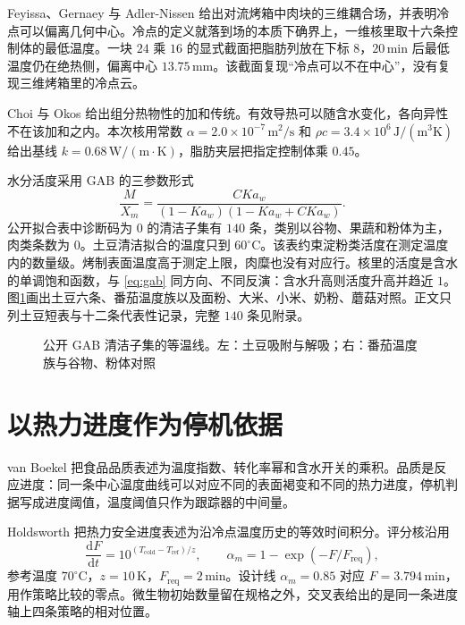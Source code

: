 Feyissa、Gernaey 与 Adler-Nissen 给出对流烤箱中肉块的三维耦合场，并表明冷点可以偏离几何中心\cite{feyissa2013}。冷点的定义就落到场的本质下确界上，一维核里取十六条控制体的最低温度。一块 \(24\) 乘 \(16\) 的显式截面把脂肪列放在下标 \(8\)，\(20\,\mathrm{min}\) 后最低温度仍在绝热侧，偏离中心 \(13.75\,\mathrm{mm}\)。该截面复现“冷点可以不在中心”，没有复现三维烤箱里的冷点云。

Choi 与 Okos 给出组分热物性的加和传统\cite{choi1986}。有效导热可以随含水变化，各向异性不在该加和之内。本次核用常数 \(\alpha=2.0\times 10^{-7}\,\mathrm{m}^2/\mathrm{s}\) 和 \(\rho c=3.4\times 10^{6}\,\mathrm{J}/(\mathrm{m}^3\mathrm{K})\) 给出基线 \(k=0.68\,\mathrm{W}/(\mathrm{m\cdot K})\)，脂肪夹层把指定控制体乘 \(0.45\)。

水分活度采用 GAB 的三参数形式\cite{gab1980}
\begin{equation}
\label{eq:gab}
\frac{M}{X_m}=\frac{C K a_w}{(1-K a_w)(1-K a_w+C K a_w)}.
\end{equation}
公开拟合表\cite{sorption2026}中诊断码为 \(0\) 的清洁子集有 \(140\) 条，类别以谷物、果蔬和粉体为主，肉类条数为 \(0\)。土豆清洁拟合的温度只到 \(60^\circ\mathrm{C}\)。该表约束淀粉类活度在测定温度内的数量级。烤制表面温度高于测定上限，肉糜也没有对应行。核里的活度是含水的单调饱和函数，与 \eqref{eq:gab} 同方向、不同反演：含水升高则活度升高并趋近 \(1\)。图\ref{fig:gab}{}画出土豆六条、番茄温度族以及面粉、大米、小米、奶粉、蘑菇对照。正文只列土豆短表与十二条代表性记录，完整 \(140\) 条见附录。

\begin{figure}[htbp]
\centering
{}
\caption{公开 GAB 清洁子集的等温线。左：土豆吸附与解吸；右：番茄温度族与谷物、粉体对照}
\label{fig:gab}
\end{figure}



\section{以热力进度作为停机依据}

van Boekel 把食品品质表述为温度指数、转化率幂和含水开关的乘积\cite{vanboekel2008}。品质是反应进度：同一条中心温度曲线可以对应不同的表面褐变和不同的热力进度，停机判据写成进度阈值，温度阈值只作为跟踪器的中间量。

Holdsworth 把热力安全进度表述为沿冷点温度历史的等效时间积分\cite{holdsworth1997}。评分核沿用
\[
\frac{\mathrm{d}F}{\mathrm{d}t}=10^{(T_{\mathrm{cold}}-T_{\mathrm{ref}})/z},\qquad
\alpha_m=1-\exp(-F/F_{\mathrm{req}}),
\]
参考温度 \(70^\circ\mathrm{C}\)，\(z=10\,\mathrm{K}\)，\(F_{\mathrm{req}}=2\,\mathrm{min}\)。设计线 \(\alpha_m=0.85\) 对应 \(F=3.794\,\mathrm{min}\)，用作策略比较的零点。微生物初始数量留在规格之外，交叉表给出的是同一条进度轴上四条策略的相对位置。

